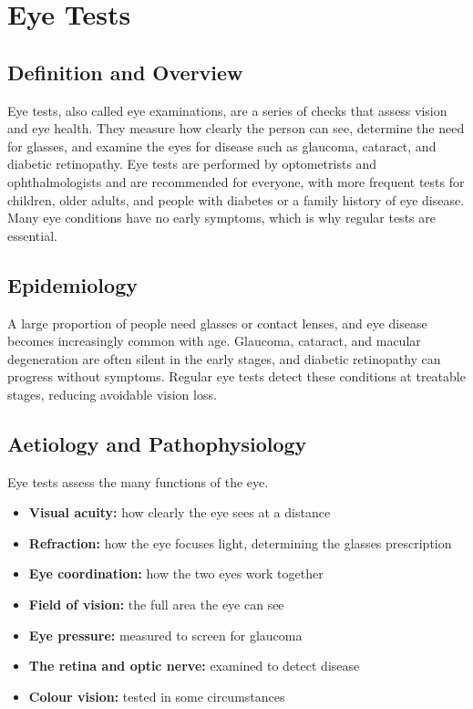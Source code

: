 \chapter{Eye Tests}

\section*{Definition and Overview}
Eye tests, also called eye examinations, are a series of checks that assess vision and eye health. They measure how clearly the person can see, determine the need for glasses, and examine the eyes for disease such as glaucoma, cataract, and diabetic retinopathy. Eye tests are performed by optometrists and ophthalmologists and are recommended for everyone, with more frequent tests for children, older adults, and people with diabetes or a family history of eye disease. Many eye conditions have no early symptoms, which is why regular tests are essential.

\section*{Epidemiology}
A large proportion of people need glasses or contact lenses, and eye disease becomes increasingly common with age. Glaucoma, cataract, and macular degeneration are often silent in the early stages, and diabetic retinopathy can progress without symptoms. Regular eye tests detect these conditions at treatable stages, reducing avoidable vision loss.

\section*{Aetiology and Pathophysiology}
Eye tests assess the many functions of the eye.
\begin{itemize}
    \item \textbf{Visual acuity:} how clearly the eye sees at a distance
    \item \textbf{Refraction:} how the eye focuses light, determining the glasses prescription
    \item \textbf{Eye coordination:} how the two eyes work together
    \item \textbf{Field of vision:} the full area the eye can see
    \item \textbf{Eye pressure:} measured to screen for glaucoma
    \item \textbf{The retina and optic nerve:} examined to detect disease
    \item \textbf{Colour vision:} tested in some circumstances
\end{itemize}

